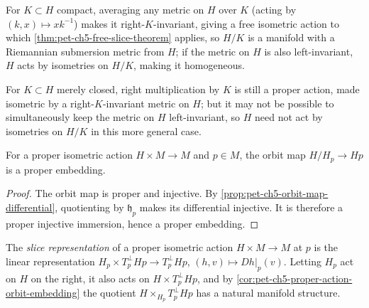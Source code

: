 \begin{remark}
  \label{rem:pet-ch5-quotient-homogeneous}
  For $K\subset H$ compact, averaging any metric on $H$ over $K$ (acting by
  $(k,x)\mapsto xk^{-1}$) makes it right-$K$-invariant, giving a free isometric
  action to which \cref{thm:pet-ch5-free-slice-theorem} applies, so $H/K$ is a
  manifold with a Riemannian submersion metric from $H$; if the metric on $H$ is
  also left-invariant, $H$ acts by isometries on $H/K$, making it homogeneous.
\end{remark}

\begin{remark}
  \label{rem:pet-ch5-closed-subgroup-quotient}
  For $K\subset H$ merely closed, right multiplication by $K$ is still a proper
  action, made isometric by a right-$K$-invariant metric on $H$; but it may not be
  possible to simultaneously keep the metric on $H$ left-invariant, so $H$ need not
  act by isometries on $H/K$ in this more general case.
\end{remark}

\begin{corollary}
  \label{cor:pet-ch5-proper-action-orbit-embedding}
  For a proper isometric action $H\times M\to M$ and $p\in M$, the orbit map
  $H/H_p\to Hp$ is a proper embedding.
\end{corollary}
\begin{proof}
  \sketch
  The orbit map is proper and injective.  By
  \cref{prop:pet-ch5-orbit-map-differential}, quotienting by $\mathfrak h_p$ makes
  its differential injective.  It is therefore a proper injective immersion, hence
  a proper embedding.
\end{proof}

\begin{definition}
  \label{def:pet-ch5-slice-representation}
  The \emph{slice representation} of a proper isometric action $H\times M\to M$ at
  $p$ is the linear representation $H_p\times T_p^\perp Hp\to T_p^\perp Hp$,
  $(h,v)\mapsto Dh|_p(v)$. Letting $H_p$ act on $H$ on the right, it also acts on
  $H\times T_p^\perp Hp$, and by \cref{cor:pet-ch5-proper-action-orbit-embedding}
  the quotient $H\times_{H_p}T_p^\perp Hp$ has a natural manifold structure.
\end{definition}

